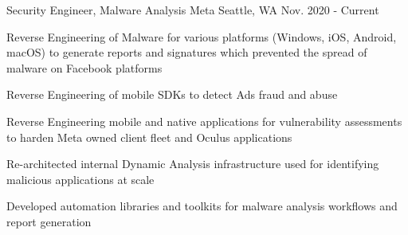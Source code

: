 


\begin{cventries}




\cventry
{Security Engineer, Malware Analysis} %
{Meta} %
{Seattle, WA} %
{Nov. 2020 - Current} %
{ %
\begin{cvitems}
\item {Reverse Engineering of Malware for various platforms (Windows, iOS, Android, macOS) to generate reports and signatures which prevented the spread of malware on Facebook platforms}
\item {Reverse Engineering of mobile SDKs to detect Ads fraud and abuse}
\item {Reverse Engineering mobile and native applications for vulnerability assessments to harden Meta owned client fleet and Oculus applications}
\item {Re-architected internal Dynamic Analysis infrastructure used for identifying malicious applications at scale}
\item {Developed automation libraries and toolkits for malware analysis workflows and report generation}
\end{cvitems}
}


\end{cventries}
